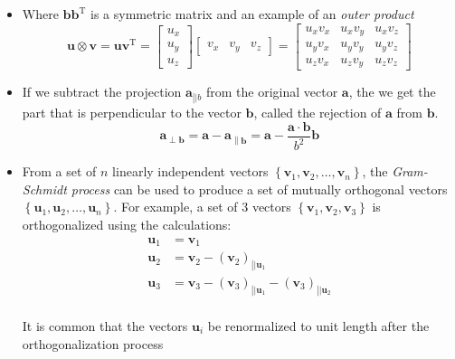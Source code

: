 \documentclass[11pt]{article}
\newcommand{\bm}[1]{\mathbf{#1}}
\begin{document}
\begin{itemize}
\item Where $\bm{b} \bm{b}^\text{T}$ is a symmetric matrix and an example of an \textit{outer product}
    \begin{equation}
        \bm{u} \otimes \bm{v} = \bm{u} \bm{v}^\text{T} =
        \begin{bmatrix}
        u_x \\
        u_y \\
        u_z
        \end{bmatrix}
        \begin{bmatrix}
        v_x & v_y & v_z
        \end{bmatrix} =
        \begin{bmatrix}
        u_x v_x & u_x v_y & u_x v_z \\
        u_y v_x & u_y v_y & u_y v_z \\
        u_z v_x & u_z v_y & u_z v_z
        \end{bmatrix}
    \end{equation}
\item If we subtract the projection $\bm{a}_{\left||b\right.}$ from the original vector $\bm{a}$, the we get the part that is perpendicular to the vector $\bm{b}$, called the rejection of $\bm{a}$ from $\bm{b}$.
    \begin{equation}
        \bm{a}_{\perp \bm{b}} = \bm{a} - \bm{a}_{\left\|\bm{b}\right.} = \bm{a} - \frac{\bm{a} \cdot \bm{b}}{b^2} \bm{b}
    \end{equation}
\item From a set of $n$ linearly independent vectors $\left\{ \bm{v}_1, \bm{v}_2, \ldots, \bm{v}_n \right\}$, the \textit{Gram-Schmidt process} can be used to produce a set of mutually orthogonal vectors $\left\{  \bm{u}_1, \bm{u}_2, \ldots, \bm{u}_n \right\}$.  For example, a set of 3 vectors $\left\{  \bm{v}_1, \bm{v}_2, \bm{v}_3 \right\}$ is orthogonalized using the calculations:
    $$
    \begin{aligned}
        \bm{u}_1 &= \bm{v}_1 \\
        \bm{u}_2 &=
            \bm{v}_2
            - \left( \bm{v}_2 \right)_{\left|| \bm{u}_1 \right.} \\
        \bm{u}_3 &=
            \bm{v}_3
            - \left( \bm{v}_3 \right)_{\left|| \bm{u}_1 \right.}
            - \left( \bm{v}_3 \right)_{\left|| \bm{u}_2 \right.}\\
    \end{aligned}
    $$

    It is common that the vectors $\bm{u}_i$ be renormalized to unit length after the orthogonalization process
\end{itemize}
\end{document}
